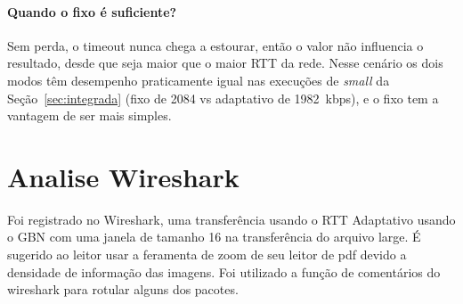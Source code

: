 \documentclass[11pt,a4paper]{article}
\begin{document}
\paragraph{Quando o fixo é suficiente?} Sem perda, o timeout nunca chega a
estourar, então o valor não influencia o resultado, desde que seja maior que o
maior RTT da rede. Nesse cenário os dois modos têm desempenho praticamente
igual nas execuções de \textit{small} da Seção~\ref{sec:integrada} (fixo de 2084 vs adaptativo de
1982~kbps), e o fixo tem a vantagem de ser mais simples.


%

\section{Analise Wireshark}

%

Foi registrado no Wireshark, uma transferência usando o RTT Adaptativo usando o
GBN com uma janela de tamanho 16 na transferência do arquivo large. 
É sugerido ao leitor usar a feramenta de zoom de seu leitor de pdf devido a densidade de informação das imagens.
Foi utilizado a função de comentários do wireshark para rotular alguns dos pacotes.
\end{document}
